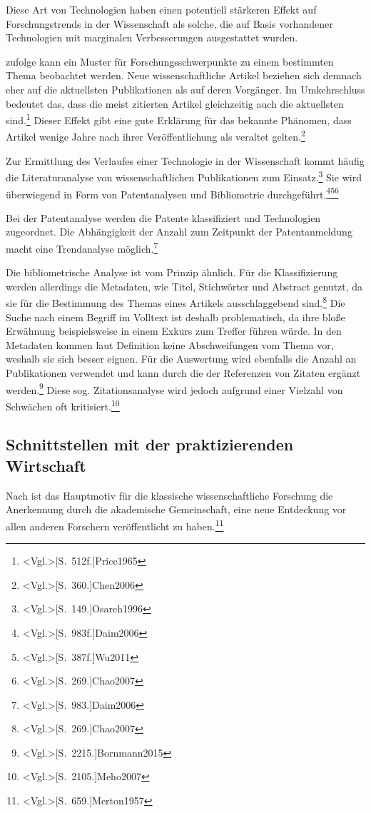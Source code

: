 Diese Art von Technologien haben einen potentiell stärkeren Effekt auf Forschungstrends in der Wissenschaft als solche, die auf Basis vorhandener Technologien mit marginalen Verbesserungen ausgestattet wurden.

 zufolge kann ein Muster für Forschungsschwerpunkte zu einem bestimmten Thema beobachtet werden. Neue wissenschaftliche Artikel beziehen sich demnach eher auf die aktuellsten Publikationen als auf deren Vorgänger. Im Umkehrschluss bedeutet das, dass die meist zitierten Artikel gleichzeitig auch die aktuellsten sind.\footnote{\citeNP<Vgl.>[S.~512f.]{Price1965}} Dieser Effekt gibt eine gute Erklärung für das bekannte Phänomen, dass Artikel wenige Jahre nach ihrer Veröffentlichung als veraltet gelten.\footnote{\citeNP<Vgl.>[S.~360.]{Chen2006}}

Zur Ermittlung des Verlaufes einer Technologie in der Wissenschaft kommt häufig die Literaturanalyse von wissenschaftlichen Publikationen zum Einsatz.\footnote{\citeNP<Vgl.>[S.~149.]{Osareh1996}} Sie wird überwiegend in Form von Patentanalysen und Bibliometrie durchgeführt.\footnote{\citeNP<Vgl.>[S.~983f.]{Daim2006}}\footnote{\citeNP<Vgl.>[S.~387f.]{Wu2011}}\footnote{\citeNP<Vgl.>[S.~269.]{Chao2007}}

Bei der Patentanalyse werden die Patente klassifiziert und Technologien zugeordnet. Die Abhängigkeit der Anzahl zum Zeitpunkt der Patentanmeldung macht eine Trendanalyse möglich.\footnote{\citeNP<Vgl.>[S.~983.]{Daim2006}}

\label{sec:biblio}
Die bibliometrische Analyse ist vom Prinzip ähnlich. Für die Klassifizierung werden allerdings die Metadaten, wie Titel, Stichwörter und Abstract genutzt, da sie für die Bestimmung des Themas eines Artikels ausschlaggebend sind.\footnote{\citeNP<Vgl.>[S.~269.]{Chao2007}} Die Suche nach einem Begriff im Volltext ist deshalb problematisch, da ihre bloße Erwähnung beispielsweise in einem Exkurs zum Treffer führen würde. In den Metadaten kommen laut Definition keine Abschweifungen vom Thema vor, weshalb sie sich besser eignen. Für die Auswertung wird ebenfalls die Anzahl an Publikationen verwendet und kann durch die der Referenzen von Zitaten ergänzt werden.\footnote{\citeNP<Vgl.>[S.~2215.]{Bornmann2015}} Diese sog. Zitationsanalyse wird jedoch aufgrund einer Vielzahl von Schwächen oft kritisiert.\footnote{\citeNP<Vgl.>[S.~2105.]{Meho2007}}

\subsection{Schnittstellen mit der praktizierenden Wirtschaft}
Nach  ist das Hauptmotiv für die klassische wissenschaftliche Forschung die Anerkennung durch die akademische Gemeinschaft, eine neue Entdeckung vor allen anderen Forschern veröffentlicht zu haben.\footnote{\citeNP<Vgl.>[S.~659.]{Merton1957}}

